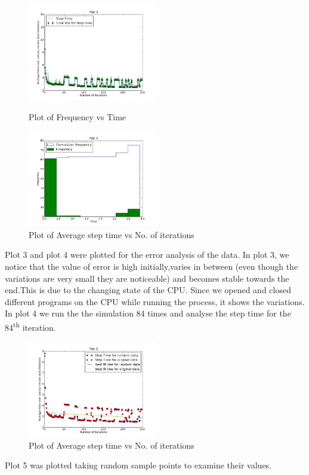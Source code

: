 \documentclass[10pt]{article} \usepackage[a4paper,left=0.8in,right=0.8in,top=0.4in,bottom=0.8in]{geometry} \usepackage{graphicx}
\begin{document}
\begin{figure}[ht!]
\centering
\includegraphics[width=0.5\textwidth]{images/plot3.jpg}
\caption{Plot of Frequency vs Time}
\includegraphics[width=0.5\textwidth]{images/plot4.jpg}
\caption{Plot of Average step time vs No. of iterations}
\end{figure}
Plot 3 and plot 4 were plotted for the error analysis of the data. In plot 3, we notice that the value of error is high initially,varies in between (even though the variations are very small they are noticeable) and becomes stable towards the end.This is due to the changing state of the CPU. Since we opened and closed different programs on the CPU while running the process, it shows the variations. In plot 4 we run the the simulation 84 times and analyse the step time for the 84\textsuperscript{th} iteration.

\begin{figure}[ht!]
\centering
\includegraphics[width=0.5\textwidth]{images/plot5.jpg}
\caption{Plot of Average step time vs No. of iterations}
\end{figure}
Plot 5 was plotted taking random sample points to examine their values.
\end{document}
